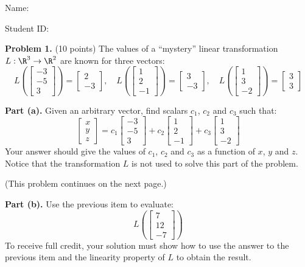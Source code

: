 \documentclass[12pt]{article}
\begin{document}
Name: \hrulefill

\bigskip
Student ID: \hrulefill


\textbf{Problem 1.} (10 points)
The values of a ``mystery'' linear transformation $L:\R^3\to\R^2$ are known for three vectors:
\[
L\left(\left[\begin{matrix}-3\\-5\\3\end{matrix}\right]\right)=\left[\begin{matrix}2\\-3\end{matrix}\right],\quad 
L\left(\left[\begin{matrix}1\\2\\-1\end{matrix}\right]\right)=\left[\begin{matrix}3\\-3\end{matrix}\right],\quad 
L\left(\left[\begin{matrix}1\\3\\-2\end{matrix}\right]\right)=\left[\begin{matrix}3\\3\end{matrix}\right]
\]

\textbf{Part (a).} Given an arbitrary vector, find scalars $c_1$, $c_2$ and $c_3$ such that:
\[
\begin{bmatrix}x\\y\\z\end{bmatrix}=c_1\left[\begin{matrix}-3\\-5\\3\end{matrix}\right]+c_2\left[\begin{matrix}1\\2\\-1\end{matrix}\right]+c_3\left[\begin{matrix}1\\3\\-2\end{matrix}\right]
\]
Your answer should give the values of $c_1$, $c_2$ and $c_3$ as a function of $x$, $y$ and $z$. Notice that the transformation $L$ is not used to solve this part of the problem.

\vfill
(This problem continues on the next page.)

\clearpage

\textbf{Part (b).} Use the previous item to evaluate:
\[
L\left(\left[\begin{matrix}7\\12\\-7\end{matrix}\right]\right)
\]
To receive full credit, your solution must show how to use the answer to the previous item and the linearity property of $L$ to obtain the result. 
\end{document}
